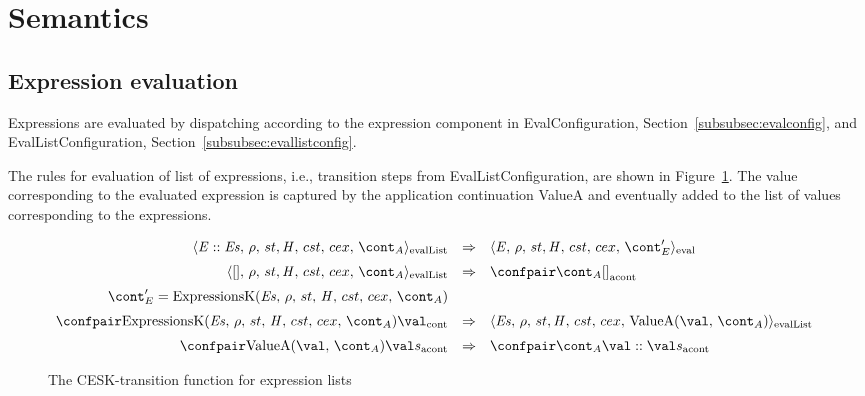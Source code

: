 \documentclass{article}
\newcounter{rowcount}[figure]
\newcounter{figurecount}
\newcommand{\myrowcount}{\refstepcounter{rowcount}\thesubsection.\thefigurecount.\therowcount}
\newcommand{\labeledrow}[1]{\myrowcount\label{#1}}
\begin{document}
\section{Semantics}
\label{sec:semantics}
\subsection{Expression evaluation}
\label{subsec:expr-evaluation}
\newcommand{\this}{\tt{this}}
\newcommand{\superclass}[1]{superclass({#1})}

Expressions are evaluated by dispatching according to the expression component in EvalConfiguration, Section~\ref{subsubsec:evalconfig}, and EvalListConfiguration, Section~\ref{subsubsec:evallistconfig}.

\noindent
The rules for evaluation of list of expressions, i.e., transition steps from EvalListConfiguration, are shown in Figure~\ref{figure:evallist}.
The value corresponding to the evaluated expression is captured by the application continuation ValueA and eventually added to the list of values corresponding to the expressions.
%
%
\label{subsec:eval-list-expressions}
\begin{figure}[Htp]
  $
  \begin{array}{rcl}
	\cesktrans{
		\evallistconf{\expr :: \exprs}{\env}{\strace}{\cstrace}{\cex}{\acont}}{
		\evalconf{\expr}{\env}{\strace}{\cstrace}{\cex}{\econt'}}
		\\[2mm]

	\cesktrans{
		\evallistconf{[]}{\env}{\strace}{\cstrace}{\cex}{\acont}}{
		\acontconf{\acont}{[]}}
		\\[2mm]
	\hspace{3mm}\econt' = \ExpressionsK{\exprs}{\env}{\acont}
	\\[2mm]

	\cesktrans{
		\contconf{\ExpressionsK{\exprs}{\env}{\acont}}{\val}}{
		\evallistconf{\exprs}{\env}{\strace}{\cstrace}{\cex}{\ValueA{\val}{\acont}}}
		\\[2mm]

	\cesktrans{
		\acontconf{\ValueA{\val}{\acont}}{\val s}}{
		\acontconf{\acont}{\val :: \val s}}
  \end{array}
  $
  \caption{The CESK-transition function for expression lists}\label{figure:evallist}
\end{figure}
\end{document}
